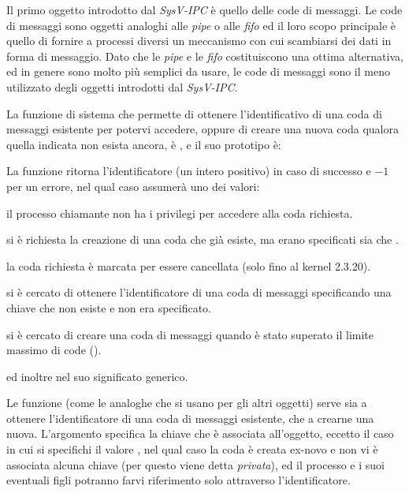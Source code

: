 Il primo oggetto introdotto dal \textit{SysV-IPC} è quello delle code di
messaggi.  Le code di messaggi sono oggetti analoghi alle \textit{pipe} o alle
\textit{fifo} ed il loro scopo principale è quello di fornire a processi
diversi un meccanismo con cui scambiarsi dei dati in forma di messaggio. Dato
che le \textit{pipe} e le \textit{fifo} costituiscono una ottima alternativa,
ed in genere sono molto più semplici da usare, le code di messaggi sono il
meno utilizzato degli oggetti introdotti dal \textit{SysV-IPC}.

La funzione di sistema che permette di ottenere l'identificativo di una coda
di messaggi esistente per potervi accedere, oppure di creare una nuova coda
qualora quella indicata non esista ancora, è , e il suo
prototipo è:

\begin{funcproto}{
}

{La funzione ritorna l'identificatore (un intero positivo) in caso di successo
  e $-1$ per un errore, nel qual caso  assumerà uno dei valori:
  \begin{errlist}
  \item[\errcode{EACCES}] il processo chiamante non ha i privilegi per
    accedere alla coda richiesta.
  \item[\errcode{EEXIST}] si è richiesta la creazione di una coda che già
    esiste, ma erano specificati sia  che .
  \item[\errcode{EIDRM}] la coda richiesta è marcata per essere cancellata
    (solo fino al kernel 2.3.20).
  \item[\errcode{ENOENT}] si è cercato di ottenere l'identificatore di una coda
    di messaggi specificando una chiave che non esiste e 
    non era specificato.
  \item[\errcode{ENOSPC}] si è cercato di creare una coda di messaggi quando è
    stato superato il limite massimo di code ().
 \end{errlist}
 ed inoltre  nel suo significato generico.}
\end{funcproto}

Le funzione (come le analoghe che si usano per gli altri oggetti) serve sia a
ottenere l'identificatore di una coda di messaggi esistente, che a crearne una
nuova. L'argomento  specifica la chiave che è associata
all'oggetto, eccetto il caso in cui si specifichi il valore
, nel qual caso la coda è creata ex-novo e non vi è
associata alcuna chiave (per questo viene detta \textsl{privata}), ed il
processo e i suoi eventuali figli potranno farvi riferimento solo attraverso
l'identificatore.

